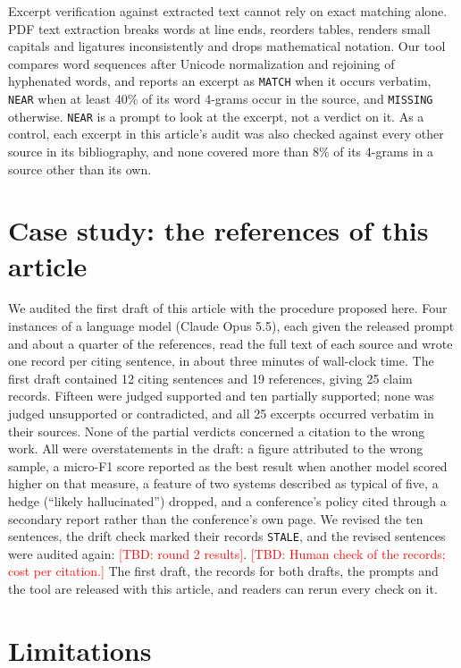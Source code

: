 \documentclass[11pt]{article}
\newcommand{\TBD}[1]{\textcolor{red}{[TBD: #1]}}
\begin{document}
Excerpt verification against extracted text cannot rely on exact matching alone. PDF text extraction breaks words at line ends, reorders tables, renders small capitals and ligatures inconsistently and drops mathematical notation. Our tool compares word sequences after Unicode normalization and rejoining of hyphenated words, and reports an excerpt as \texttt{MATCH} when it occurs verbatim, \texttt{NEAR} when at least 40\% of its word 4-grams occur in the source, and \texttt{MISSING} otherwise. \texttt{NEAR} is a prompt to look at the excerpt, not a verdict on it. As a control, each excerpt in this article's audit was also checked against every other source in its bibliography, and none covered more than 8\% of its 4-grams in a source other than its own.

\section{Case study: the references of this article}

We audited the first draft of this article with the procedure proposed here. Four instances of a language model (Claude Opus 5.5), each given the released prompt and about a quarter of the references, read the full text of each source and wrote one record per citing sentence, in about three minutes of wall-clock time. The first draft contained 12 citing sentences and 19 references, giving 25 claim records. Fifteen were judged supported and ten partially supported; none was judged unsupported or contradicted, and all 25 excerpts occurred verbatim in their sources. None of the partial verdicts concerned a citation to the wrong work. All were overstatements in the draft: a figure attributed to the wrong sample, a micro-F1 score reported as the best result when another model scored higher on that measure, a feature of two systems described as typical of five, a hedge (``likely hallucinated'') dropped, and a conference's policy cited through a secondary report rather than the conference's own page. We revised the ten sentences, the drift check marked their records \texttt{STALE}, and the revised sentences were audited again: \TBD{round 2 results}. \TBD{Human check of the records; cost per citation.} The first draft, the records for both drafts, the prompts and the tool are released with this article, and readers can rerun every check on it.

\section{Limitations}
\end{document}
